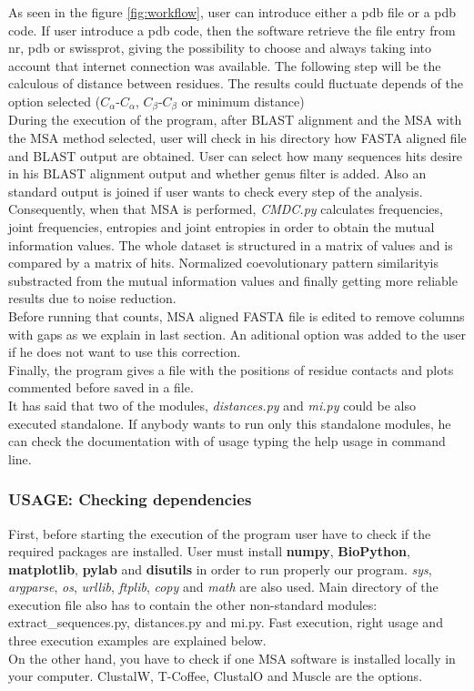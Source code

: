 \documentclass[12pt]{article}
\begin{document}
As seen in the figure \ref{fig:workflow}, user can introduce either a pdb file or a pdb code. If user introduce a pdb code, then the software retrieve the file entry from nr, pdb or swissprot, giving the possibility to choose and always taking into account that internet connection was available. The following step will be the calculous of distance between residues. The results could fluctuate depends of the option selected ($C_{\alpha}$-$C_{\alpha}$, $C_{\beta}$-$C_{\beta}$ or minimum distance) \\
During the execution of the program, after BLAST alignment and the MSA with the MSA method selected, user will check in his directory how FASTA aligned file and BLAST output are obtained. User can select how many sequences hits desire in his BLAST alignment output and whether genus filter is added. Also an standard output is joined if user wants to check every step of the analysis.\\
Consequently, when that MSA is performed, \textit{CMDC.py} calculates frequencies, joint frequencies, entropies and joint entropies in order to obtain the mutual information values. The whole dataset is structured in a matrix of values and is compared by a matrix of hits. Normalized coevolutionary
pattern similarityis substracted from the mutual information values and finally getting more reliable results due to noise reduction.\\ Before running that counts, MSA aligned FASTA file is edited to remove columns with gaps as we explain in last section. An aditional option was added to the user if he does not want to use this correction. \\
Finally, the program gives a file with the positions of residue contacts and plots commented before saved in a file.\\
It has said that two of the modules, \textit{distances.py} and \textit{mi.py} could be also executed standalone. If anybody wants to run only this standalone modules, he can check the documentation with of usage typing the help usage in command line.

\subsubsection{USAGE: Checking dependencies}
First, before starting the execution of the program user have to check if the required packages are installed. User must install \textbf{numpy}\cite{VanderWalt2011}, \textbf{BioPython}\cite{Cock2009}, \textbf{matplotlib}\cite{Hunter2007}, \textbf{pylab} and \textbf{disutils} in order to run properly our program. \textit{sys}, \textit{argparse}, \textit{os}, \textit{urllib}, \textit{ftplib}, \textit{copy} and \textit{math} are also used. Main directory of the execution file also has to contain the other non-standard modules: extract\_sequences.py, distances.py and mi.py. Fast execution, right usage and three execution examples are explained below.\\
On the other hand, you have to check if one MSA software is installed locally in your computer. ClustalW, T-Coffee, ClustalO and Muscle are the options.
\end{document}

